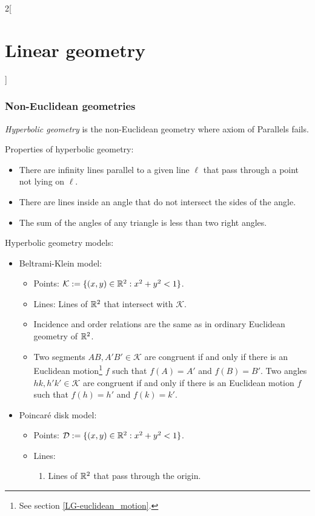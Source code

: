 \documentclass[../../../main.tex]{subfiles}
\begin{document}
\begin{multicols}{2}[\section{Linear geometry}]
\subsubsection*{Non-Euclidean geometries}
\begin{definition}
\textit{Hyperbolic geometry} is the non-Euclidean geometry where axiom of Parallels fails.
\end{definition}
\begin{prop}
Properties of hyperbolic geometry:
\begin{itemize}
    \item There are infinity lines parallel to a given line $\ell$ that pass through a point not lying on $\ell$.
    \item There are lines inside an angle that do not intersect the sides of the angle.
    \item The sum of the angles of any triangle is less than two right angles.
\end{itemize}
\end{prop}
\begin{definition}
Hyperbolic geometry models:
\begin{itemize}
    \item Beltrami-Klein model:
    \begin{itemize}
        \item Points: $\mathcal{K}:=\{(x,y)\in\mathbb{R}^2:x^2+y^2<1\}$.
        \item Lines: Lines of $\mathbb{R}^2$ that intersect with $\mathcal{K}$.
        \item Incidence and order relations are the same as in ordinary Euclidean geometry of $\mathbb{R}^2$.
        \item Two segments $AB,A'B'\in\mathcal{K}$ are congruent if and only if there is an Euclidean motion\footnote{See section \ref{LG-euclidean_motion}.} $f$ such that $f(A)=A'$ and $f(B)=B'$. Two angles $hk,h'k'\in\mathcal{K}$ are congruent if and only if there is an Euclidean motion $f$ such that $f(h)=h'$ and $f(k)=k'$.
    \end{itemize}
    \item Poincaré disk model:
    \begin{itemize}
        \item Points: $\mathcal{D}:=\{(x,y)\in\mathbb{R}^2:x^2+y^2<1\}$.
        \item Lines: 
        \begin{enumerate}
            \item Lines of $\mathbb{R}^2$ that pass through the origin.

\end{enumerate}
\end{itemize}
\end{itemize}
\end{definition}
\end{multicols}
\end{document}
